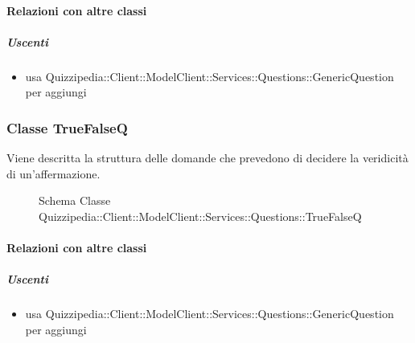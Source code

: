\paragraph{Relazioni con altre classi}
\subparagraph{Uscenti}
\begin{itemize}
\item usa Quizzipedia::Client::ModelClient::Services::Questions::GenericQuestion per aggiungi
\end{itemize}
\subsubsection{Classe TrueFalseQ}
Viene descritta la struttura delle domande che prevedono di decidere la veridicità di un'affermazione.
\begin{figure}[H]
\centering
\noindent{}
\caption[Schema Classe TrueFalseQ]{Schema Classe Quizzipedia::Client::ModelClient::Services::Questions::TrueFalseQ}
\end{figure}
\paragraph{Relazioni con altre classi}
\subparagraph{Uscenti}
\begin{itemize}
\item usa Quizzipedia::Client::ModelClient::Services::Questions::GenericQuestion per aggiungi
\end{itemize}
